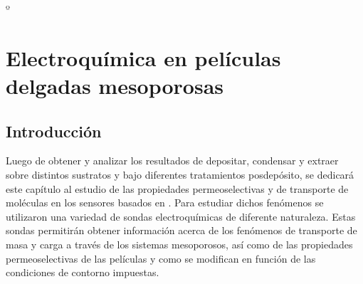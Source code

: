 	º	%
 \newcommand{\NoBiblioEQ}[1]{
 \ifthenelse{\equal{#1}{verdadero}}{}{}
 \NoBiblioEQ{verdadero}}


 \FormatoCapituloDosLineas
 
 \chapter{Electroquímica en películas delgadas mesoporosas}
 \label{chap:Electroquimica}

 \thispagestyle{empty}
	

 \vfill
 \minitoc
 \newpage

\section{Introducción}

	Luego de obtener y analizar los resultados de depositar, condensar y extraer \pdm\space sobre distintos sustratos y bajo diferentes tratamientos posdepósito, se dedicará este capítulo al estudio de las propiedades permeoselectivas y de transporte de moléculas en los sensores basados en \pdm. Para estudiar dichos fenómenos se utilizaron una variedad de sondas electroquímicas de diferente naturaleza. Estas sondas permitirán obtener información acerca de los fenómenos de transporte de masa y carga a través de los sistemas mesoporosos, así como de las propiedades permeoselectivas de las películas y como se modifican en función de las condiciones de contorno impuestas. 

